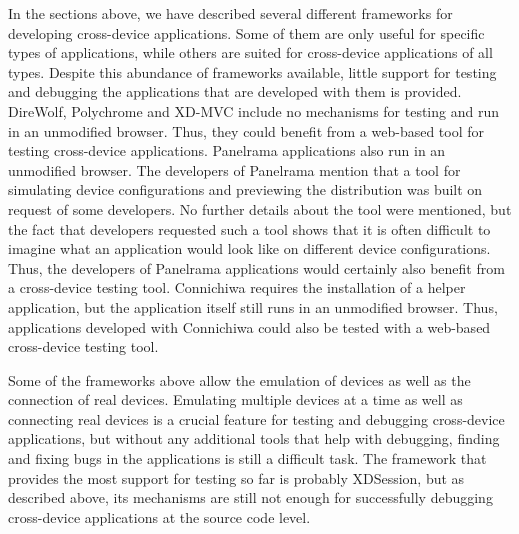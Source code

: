 In the sections above, we have described several different frameworks for developing cross-device applications. Some of them are only useful for specific types of applications, while others are suited for cross-device applications of all types. Despite this abundance of frameworks available, little support for testing and debugging the applications that are developed with them is provided. DireWolf, Polychrome and XD-MVC include no mechanisms for testing and run in an unmodified browser. Thus, they could benefit from a web-based tool for testing cross-device applications. Panelrama applications also run in an unmodified browser. The developers of Panelrama mention that a tool for simulating device configurations and previewing the distribution was built on request of some developers. No further details about the tool were mentioned, but the fact that developers requested such a tool shows that it is often difficult to imagine what an application would look like on different device configurations. Thus, the developers of Panelrama applications would certainly also benefit from a cross-device testing tool. Connichiwa requires the installation of a helper application, but the application itself still runs in an unmodified browser. Thus, applications developed with Connichiwa could also be tested with a web-based cross-device testing tool.

Some of the frameworks above allow the emulation of devices as well as the connection of real devices. Emulating multiple devices at a time as well as connecting real devices is a crucial feature for testing and debugging cross-device applications, but without any additional tools that help with debugging, finding and fixing bugs in the applications is still a difficult task. The framework that provides the most support for testing so far is probably XDSession, but as described above, its mechanisms are still not enough for successfully debugging cross-device applications at the source code level.